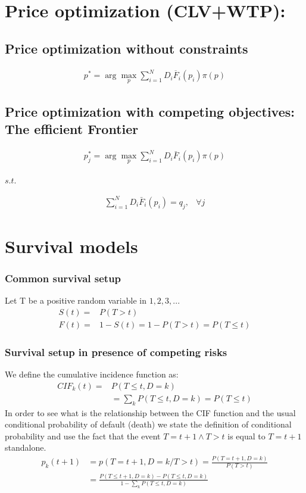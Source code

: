 \documentclass[12pt]{book}
\begin{document}
\chapter{Price optimization (CLV+WTP): }
\section{Price optimization without constraints}
\begin{align}
p^*= \arg \max_p \sum_{i=1}^N D_i\overline{F}_i(p_i)\pi(p)
\end{align}

\section{Price optimization with competing objectives: The efficient Frontier}

\begin{align}
p^*_j= \arg \max_p \sum_{i=1}^N D_i\bar{F}_i(p_i)\pi(p)
\end{align}
\begin{center}
    $s.t.$
\end{center}
\begin{align}
\sum_{i=1}^N D_i\bar{F}_i(p_i) =q_j,& \forall j
\end{align}


\chapter{Survival models}
\subsection{Common survival setup}
Let T be a positive random variable in $1,2,3,...$
\begin{align}
    S(t)=&P(T>t) \\
    F(t)=&1-S(t)=1-P(T>t)=P(T\leq t)
\end{align}
\subsection{Survival setup in presence of competing risks}

We define the cumulative incidence function as:
\begin{align}
    CIF_k(t)=&P(T\leq t,D=k) \\
    &=\sum_k P(T \leq t,D=k) = P(T \leq t)
\end{align}
In order to see what is the relationship between the CIF function and the usual conditional probability of default (death) we state the definition of conditional probability and use the fact that the event $T=t+1 \wedge T>t$ is equal to $T=t+1$ standalone.
\begin{align}
    p_k(t+1)&=p(T=t+1,D=k/T>t)=\frac{P(T=t+1,D=k)}{P(T>t)}\\
    &= \frac{ P(T \leq t+1,D=k)-P(T\leq t,D=k)}{
    1-\sum_k P(T \leq t, D=k)
    }
\end{align}
\end{document}
